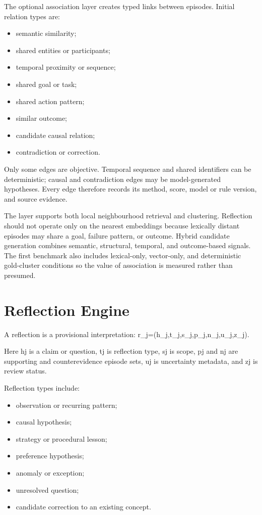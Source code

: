 \documentclass[
  english,
  a4paper,
  DIV=11,
  numbers=noendperiod]{scrreprt}
\providecommand{\tightlist}{%
  \setlength{\itemsep}{0pt}\setlength{\parskip}{0pt}}
\begin{document}
The optional association layer creates typed links between episodes.
Initial relation types are:

\begin{itemize}
\tightlist
\item
  semantic similarity;
\item
  shared entities or participants;
\item
  temporal proximity or sequence;
\item
  shared goal or task;
\item
  shared action pattern;
\item
  similar outcome;
\item
  candidate causal relation;
\item
  contradiction or correction.
\end{itemize}

Only some edges are objective. Temporal sequence and shared identifiers
can be deterministic; causal and contradiction edges may be
model-generated hypotheses. Every edge therefore records its method,
score, model or rule version, and source evidence.

The layer supports both local neighbourhood retrieval and clustering.
Reflection should not operate only on the nearest embeddings because
lexically distant episodes may share a goal, failure pattern, or
outcome. Hybrid candidate generation combines semantic, structural,
temporal, and outcome-based signals. The first benchmark also includes
lexical-only, vector-only, and deterministic gold-cluster conditions so
the value of association is measured rather than presumed.

\section{Reflection Engine}\label{reflection-engine}

A reflection is a provisional interpretation:
r\_j=(h\_j,t\_j,s\_j,p\_j,n\_j,u\_j,z\_j).

Here hj is a claim or question, tj is reflection type, sj is scope, pj
and nj are supporting and counterevidence episode sets, uj is
uncertainty metadata, and zj is review status.

Reflection types include:

\begin{itemize}
\tightlist
\item
  observation or recurring pattern;
\item
  causal hypothesis;
\item
  strategy or procedural lesson;
\item
  preference hypothesis;
\item
  anomaly or exception;
\item
  unresolved question;
\item
  candidate correction to an existing concept.
\end{itemize}
\end{document}

